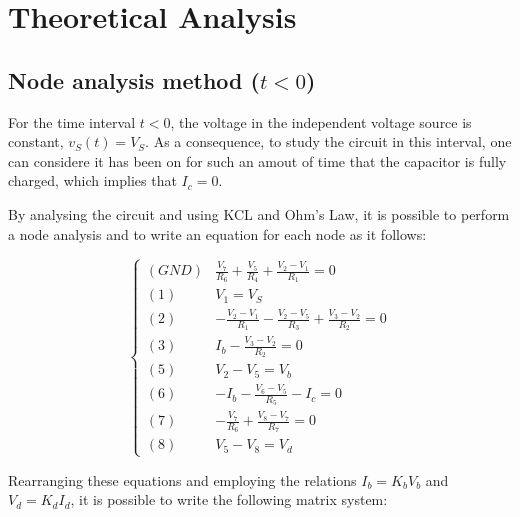 \section{Theoretical Analysis}
\label{sec:analysis}

\subsection{Node analysis method ($t < 0$)}
\label{sec:node}

For the time interval $t < 0$, the voltage in the independent voltage source is constant, $v_S(t) = V_S$. As a consequence, to study the circuit in this interval, one can considere it has been on for such an amout of time  that the capacitor is fully charged, which implies that $I_c = 0$.

By analysing the circuit and using KCL and Ohm's Law, it is possible to perform a node analysis and to write an equation for each node as it follows:

\begin{equation}
  \begin{cases}
    (GND) & \frac{V_7}{R_6} + \frac{V_5}{R_4} + \frac{V_2-V_1}{R_1} = 0 \\
    (1) & V_1 = V_S \\
    (2) & -\frac{V_2-V_1}{R_1} - \frac{V_2-V_5}{R_3} + \frac{V_3-V_2}{R_2} = 0 \\
    (3) & I_b - \frac{V_3-V_2}{R_2} = 0 \\
    (5) & V_2-V_5 = V_b \\
    (6) & -I_b - \frac{V_6-V_5}{R_5} - I_c = 0 \\
    (7) & -\frac{V_7}{R_6} + \frac{V_8-V_7}{R_7} = 0 \\
    (8) & V_5-V_8 = V_d
  \end{cases}
\end{equation}

Rearranging these equations and employing the relations $I_b = K_bV_b$ and $V_d = K_dI_d$, it is possible to write the following matrix system:

